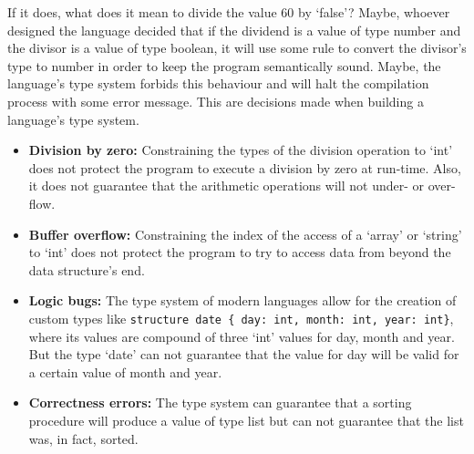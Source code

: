 \documentclass[
    oneside,
    english,
    embeddedlogo,
    noabntexcite
]{ufsc-thesis-rn46-2019}
\begin{document}
If it does, what does it mean to divide the value 60 by `false'?
Maybe, whoever designed the language decided that if the dividend is a value of type number and the divisor is a value of type boolean, it will use some rule to convert the divisor's type to number in order to keep the program semantically sound.
Maybe, the language's type system forbids this behaviour and will halt the compilation process with some error message.
This are decisions made when building a language's type system.

\begin{itemize}
    \item \textbf{Division by zero:} Constraining the types of the division operation to `int' does not protect the program to execute a division by zero at run-time.
          Also, it does not guarantee that the arithmetic operations will not under- or over-flow.
    \item \textbf{Buffer overflow:} Constraining the index of the access of a `array' or `string' to `int' does not protect the program to try to access data from beyond the data structure's end.
    \item \textbf{Logic bugs:} The type system of modern languages allow for the creation of custom types like \verb+structure date { day: int, month: int, year: int}+, where its values are compound of three `int' values for day, month and year.
          But the type `date' can not guarantee that the value for day will be valid for a certain value of month and year.
    \item \textbf{Correctness errors:} The type system can guarantee that a sorting procedure will produce a value of type list  but can not guarantee that the list was, in fact, sorted.
\end{itemize}
\end{document}
